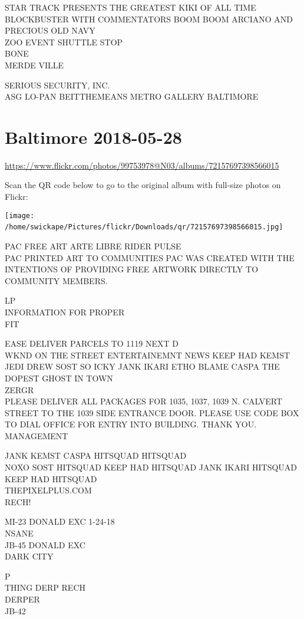 \documentclass[10pt,letterpaper]{article}
\begin{document}
STAR TRACK PRESENTS THE GREATEST KIKI OF ALL TIME BLOCKBUSTER WITH COMMENTATORS BOOM BOOM ARCIANO AND PRECIOUS OLD NAVY\\
ZOO EVENT SHUTTLE STOP\\
BONE\\
MERDE VILLE

SERIOUS SECURITY, INC.\\
ASG LO{-}PAN BEITTHEMEANS METRO GALLERY BALTIMORE
\

\section*{Baltimore 2018-05-28}

\url{https://www.flickr.com/photos/99753978@N03/albums/72157697398566015}

Scan the QR code below to go to the original album with full-size photos on Flickr:

\texttt{[image: /home/swickape/Pictures/flickr/Downloads/qr/72157697398566015.jpg]}
\

PAC FREE ART ARTE LIBRE RIDER PULSE\\
PAC PRINTED ART TO COMMUNITIES PAC WAS CREATED WITH THE INTENTIONS OF PROVIDING FREE ARTWORK DIRECTLY TO COMMUNITY MEMBERS.

LP\\
INFORMATION FOR PROPER\\
FIT

EASE DELIVER PARCELS TO 1119 NEXT D\\
WKND ON THE STREET ENTERTAINEMNT NEWS KEEP HAD KEMST JEDI DREW SOST SO ICKY JANK IKARI ETHO BLAME CASPA THE DOPEST GHOST IN TOWN\\
ZERGR\\
PLEASE DELIVER ALL PACKAGES FOR 1035, 1037, 1039 N. CALVERT STREET TO THE 1039 SIDE ENTRANCE DOOR.  PLEASE USE CODE BOX TO DIAL OFFICE FOR ENTRY INTO BUILDING.  THANK YOU.  MANAGEMENT

JANK KEMST CASPA HITSQUAD HITSQUAD\\
NOXO SOST HITSQUAD KEEP HAD HITSQUAD JANK IKARI HITSQUAD KEEP HAD HITSQUAD\\
THEPIXELPLUS.COM\\
RECH!

MI{-}23 DONALD EXC 1{-}24{-}18\\
NSANE\\
JB{-}45 DONALD EXC\\
DARK CITY

P\\
THING DERP RECH\\
DERPER\\
JB{-}42
\end{document}
